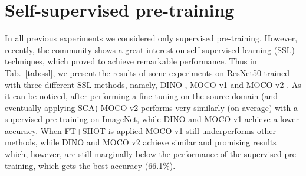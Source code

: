 \documentclass{article}
\begin{document}

\section{Self-supervised pre-training}
\label{sec:ssl}

In all previous experiments we considered only supervised pre-training. However, recently, the community shows a great interest on self-supervised learning (SSL) techniques, which proved to achieve remarkable performance. Thus in Tab.~\ref{tab:ssl}, we present the results of some  experiments on ResNet50 trained with three different SSL methods, namely, DINO \citep{dino}, MOCO v1 \citep{mocov1} and MOCO v2 \citep{mocov2}.
As it can be noticed, after performing a fine-tuning on the source domain (and eventually applying SCA) MOCO v2 performs very similarly (on average) with a supervised pre-training on ImageNet, while DINO and MOCO v1 achieve a lower accuracy.
When FT+SHOT is applied MOCO v1 still underperforms other methods, while DINO and MOCO v2 achieve similar and promising results which, however, are still marginally below the performance of the supervised pre-training, which gets the best accuracy (66.1\%). 
\end{document}
